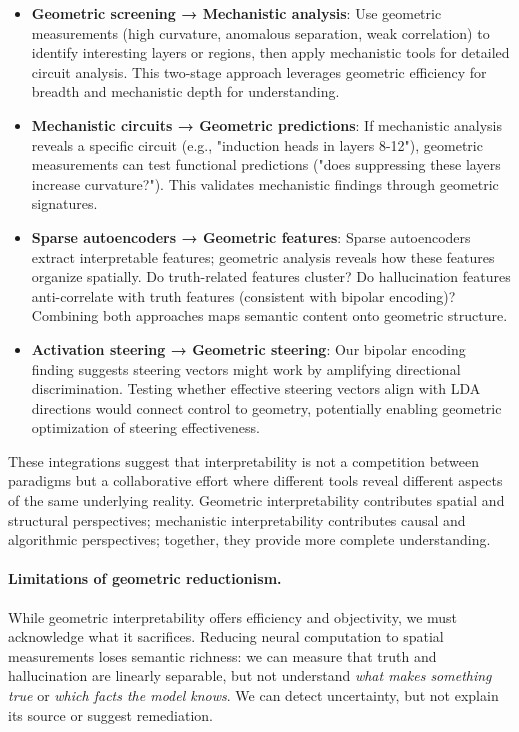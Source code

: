 \documentclass[11pt]{article}
\begin{document}
\begin{itemize}
\item \textbf{Geometric screening → Mechanistic analysis}: Use geometric measurements (high curvature, anomalous separation, weak correlation) to identify interesting layers or regions, then apply mechanistic tools for detailed circuit analysis. This two-stage approach leverages geometric efficiency for breadth and mechanistic depth for understanding.

\item \textbf{Mechanistic circuits → Geometric predictions}: If mechanistic analysis reveals a specific circuit (e.g., "induction heads in layers 8-12"), geometric measurements can test functional predictions ("does suppressing these layers increase curvature?"). This validates mechanistic findings through geometric signatures.

\item \textbf{Sparse autoencoders → Geometric features}: Sparse autoencoders \citep{templeton2024scaling} extract interpretable features; geometric analysis reveals how these features organize spatially. Do truth-related features cluster? Do hallucination features anti-correlate with truth features (consistent with bipolar encoding)? Combining both approaches maps semantic content onto geometric structure.

\item \textbf{Activation steering → Geometric steering}: Our bipolar encoding finding suggests steering vectors might work by amplifying directional discrimination. Testing whether effective steering vectors align with LDA directions would connect control to geometry, potentially enabling geometric optimization of steering effectiveness.
\end{itemize}

These integrations suggest that interpretability is not a competition between paradigms but a collaborative effort where different tools reveal different aspects of the same underlying reality. Geometric interpretability contributes spatial and structural perspectives; mechanistic interpretability contributes causal and algorithmic perspectives; together, they provide more complete understanding.

\paragraph{Limitations of geometric reductionism.}
While geometric interpretability offers efficiency and objectivity, we must acknowledge what it sacrifices. Reducing neural computation to spatial measurements loses semantic richness: we can measure that truth and hallucination are linearly separable, but not understand \textit{what makes something true} or \textit{which facts the model knows}. We can detect uncertainty, but not explain its source or suggest remediation.
\end{document}
